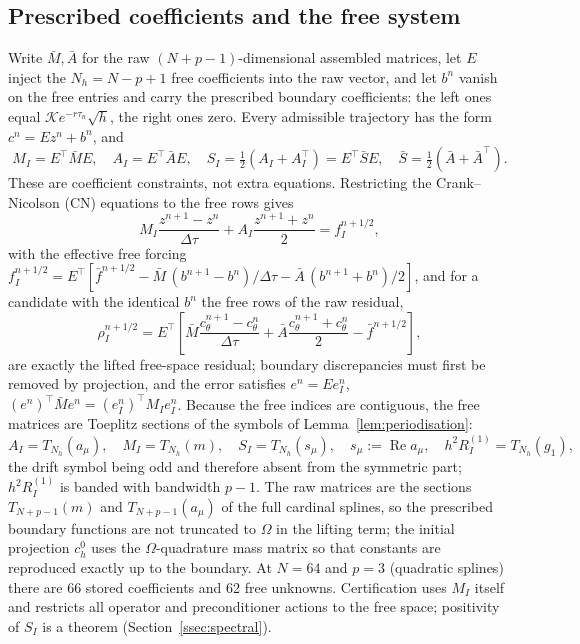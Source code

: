 \documentclass[hidelinks]{siamart251216}
\DeclareMathOperator{\Real}{Re}
\newcommand{\Tn}[2]{T_{#1}(#2)}          %
\newcommand{\sym}[1]{#1}                 %
\begin{document}
\subsection{Prescribed coefficients and the free system}
\label{ssec:constrained-system}
Write $\bar M,\bar A$ for the raw $(N+p-1)$-dimensional assembled matrices, let $E$ inject the
$N_h=N-p+1$ free coefficients into the raw vector, and let $b^n$ vanish on the free entries and
carry the prescribed boundary coefficients: the left ones equal $\mathcal K e^{-r\tau_n}\sqrt h$,
the right ones zero.  Every admissible trajectory has the form $c^n=Ez^n+b^n$, and
\[
 M_I=E^\top\bar M E,\quad A_I=E^\top\bar A E,\quad
 S_I=\tfrac12(A_I+A_I^\top)=E^\top\bar S E,\quad \bar S=\tfrac12(\bar A+\bar A^\top).
\]
These are coefficient constraints, not extra equations.  Restricting the Crank--Nicolson (CN)
equations to the free rows gives
\begin{equation}
 M_I\frac{z^{n+1}-z^n}{\Delta\tau}
 +A_I\frac{z^{n+1}+z^n}{2}=f_I^{n+1/2},
 \label{eq:constrained-cn}
\end{equation}
with the effective free forcing
$f_I^{n+1/2}=E^\top[\bar f^{n+1/2}-\bar M\,(b^{n+1}-b^n)/\Delta\tau-\bar A\,(b^{n+1}+b^n)/2]$,
and for a candidate with the identical $b^n$ the free rows of the raw residual,
\begin{equation}
 \rho_I^{n+1/2}=E^\top\!\left[\bar M\frac{c_\theta^{n+1}-c_\theta^n}{\Delta\tau}
 +\bar A\frac{c_\theta^{n+1}+c_\theta^n}{2}-\bar f^{n+1/2}\right],
 \label{eq:constrained-residual}
\end{equation}
are exactly the lifted free-space residual; boundary discrepancies must first be removed by
projection, and the error satisfies $e^n=Ee_I^n$, $(e^n)^\top\bar M e^n=(e_I^n)^\top M_I e_I^n$.
Because the free indices are contiguous, the free matrices are Toeplitz sections of the
symbols of Lemma~\ref{lem:periodisation}:
\begin{equation}
 A_I=\Tn{N_h}{\sym{a}_\mu},\quad M_I=\Tn{N_h}{\sym{m}},\quad
 S_I=\Tn{N_h}{\sym{s}_\mu},\quad \sym{s}_\mu:=\Real\sym{a}_\mu,\quad
 h^2R^{(1)}_I=\Tn{N_h}{\sym{g}_1},
 \label{eq:sections}
\end{equation}
the drift symbol being odd and therefore absent from the symmetric part; $h^2R^{(1)}_I$ is banded with
bandwidth $p-1$.  The raw matrices are the sections $\Tn{N+p-1}{\sym{m}}$ and $\Tn{N+p-1}{\sym{a}_\mu}$ of the
full cardinal splines, so the prescribed boundary functions are not truncated to $\Omega$ in the
lifting term; the initial projection $c^0_h$ uses the $\Omega$-quadrature mass matrix so that
constants are reproduced exactly up to the boundary.  At $N=64$ and $p=3$ (quadratic splines) there
are 66 stored coefficients and 62 free unknowns.  Certification uses $M_I$ itself and restricts all
operator and preconditioner actions to the free space; positivity of $S_I$ is a theorem
(Section~\ref{ssec:spectral}).
\end{document}
